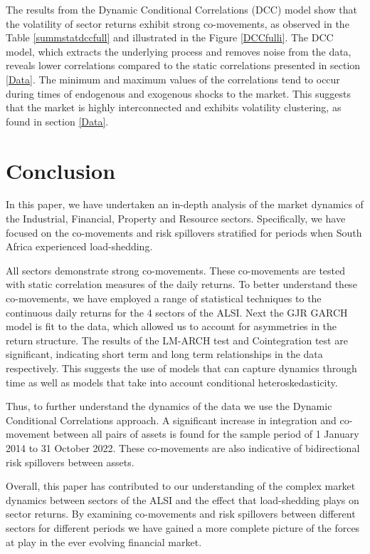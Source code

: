 \documentclass[11pt,preprint, authoryear]{elsarticle}
\numberwithin{equation}{section}
\numberwithin{figure}{section}
\numberwithin{table}{section}
\begin{document}
The results from the Dynamic Conditional Correlations (DCC) model show
that the volatility of sector returns exhibit strong co-movements, as
observed in the Table \ref{summstatdccfull} and illustrated in the
Figure \ref{DCCfulli}. The DCC model, which extracts the underlying
process and removes noise from the data, reveals lower correlations
compared to the static correlations presented in section \ref{Data}. The
minimum and maximum values of the correlations tend to occur during
times of endogenous and exogenous shocks to the market. This suggests
that the market is highly interconnected and exhibits volatility
clustering, as found in section \ref{Data}.

\hypertarget{conclusion}{%
\section{Conclusion}\label{conclusion}}

In this paper, we have undertaken an in-depth analysis of the market
dynamics of the Industrial, Financial, Property and Resource sectors.
Specifically, we have focused on the co-movements and risk spillovers
stratified for periods when South Africa experienced load-shedding.

All sectors demonstrate strong co-movements. These co-movements are
tested with static correlation measures of the daily returns. To better
understand these co-movements, we have employed a range of statistical
techniques to the continuous daily returns for the 4 sectors of the
ALSI. Next the GJR GARCH model is fit to the data, which allowed us to
account for asymmetries in the return structure. The results of the
LM-ARCH test and Cointegration test are significant, indicating short
term and long term relationships in the data respectively. This suggests
the use of models that can capture dynamics through time as well as
models that take into account conditional heteroskedasticity.

Thus, to further understand the dynamics of the data we use the Dynamic
Conditional Correlations approach. A significant increase in integration
and co-movement between all pairs of assets is found for the sample
period of 1 January 2014 to 31 October 2022. These co-movements are also
indicative of bidirectional risk spillovers between assets.

Overall, this paper has contributed to our understanding of the complex
market dynamics between sectors of the ALSI and the effect that
load-shedding plays on sector returns. By examining co-movements and
risk spillovers between different sectors for different periods we have
gained a more complete picture of the forces at play in the ever
evolving financial market.
\end{document}
